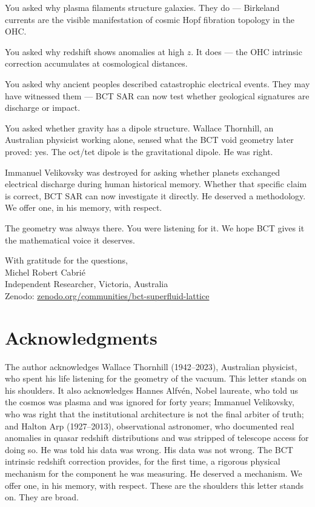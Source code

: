 \documentclass[twocolumn,10pt]{article}
\begin{document}
You asked why plasma filaments structure galaxies. They do ---
Birkeland currents are the visible manifestation of cosmic Hopf
fibration topology in the OHC.

You asked why redshift shows anomalies at high $z$. It does ---
the OHC intrinsic correction accumulates at cosmological distances.

You asked why ancient peoples described catastrophic electrical
events. They may have witnessed them --- BCT SAR can now test
whether geological signatures are discharge or impact.

You asked whether gravity has a dipole structure. Wallace Thornhill,
an Australian physicist working alone, sensed what the BCT void
geometry later proved: yes. The oct/tet dipole is the gravitational
dipole. He was right.

Immanuel Velikovsky was destroyed for asking whether planets exchanged
electrical discharge during human historical memory. Whether that
specific claim is correct, BCT SAR can now investigate it directly.
He deserved a methodology. We offer one, in his memory, with respect.

The geometry was always there. You were listening for it.
We hope BCT gives it the mathematical voice it deserves.

With gratitude for the questions,\\
Michel Robert Cabri\'{e}\\
Independent Researcher, Victoria, Australia\\
Zenodo: \href{https://zenodo.org/communities/bct-superfluid-lattice}{zenodo.org/communities/bct-superfluid-lattice}

\section*{Acknowledgments}
The author acknowledges Wallace Thornhill (1942--2023), Australian
physicist, who spent his life listening for the geometry of the
vacuum. This letter stands on his shoulders. It also acknowledges
Hannes Alfv\'{e}n, Nobel laureate, who told us the cosmos was
plasma and was ignored for forty years; Immanuel Velikovsky,
who was right that the institutional architecture is not the
final arbiter of truth; and Halton Arp (1927--2013), observational
astronomer, who documented real anomalies in quasar redshift
distributions and was stripped of telescope access for doing so.
He was told his data was wrong. His data was not wrong.
The BCT intrinsic redshift correction provides, for the first time,
a rigorous physical mechanism for the component he was measuring.
He deserved a mechanism. We offer one, in his memory, with respect.
These are the shoulders this letter stands on. They are broad.
\end{document}
